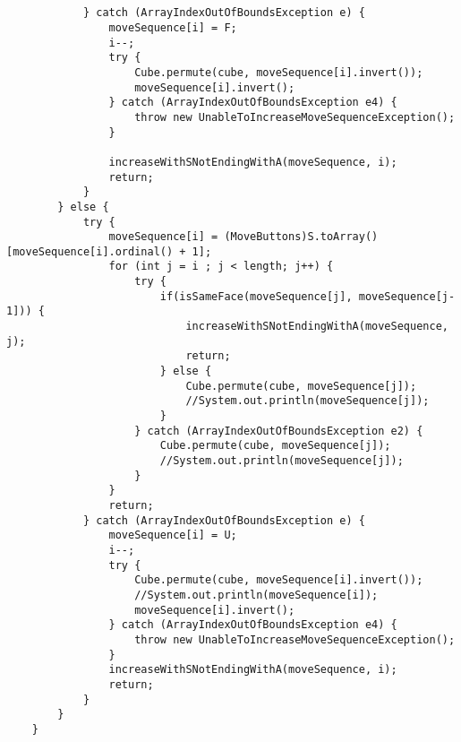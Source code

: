 \begin{verbatim}

		
			} catch (ArrayIndexOutOfBoundsException e) {
				moveSequence[i] = F;
				i--;
				try {
					Cube.permute(cube, moveSequence[i].invert());
					moveSequence[i].invert();
				} catch (ArrayIndexOutOfBoundsException e4) {
					throw new UnableToIncreaseMoveSequenceException();
				}

				increaseWithSNotEndingWithA(moveSequence, i);
				return;
			}
		} else {
			try {
				moveSequence[i] = (MoveButtons)S.toArray()[moveSequence[i].ordinal() + 1];
				for (int j = i ; j < length; j++) {
					try {
						if(isSameFace(moveSequence[j], moveSequence[j-1])) {
							increaseWithSNotEndingWithA(moveSequence, j);
							return;
						} else {
							Cube.permute(cube, moveSequence[j]);
							//System.out.println(moveSequence[j]);
						}
					} catch (ArrayIndexOutOfBoundsException e2) {
						Cube.permute(cube, moveSequence[j]);
						//System.out.println(moveSequence[j]);
					}
				}
				return; 
			} catch (ArrayIndexOutOfBoundsException e) {
				moveSequence[i] = U;
				i--;
				try {
					Cube.permute(cube, moveSequence[i].invert());
					//System.out.println(moveSequence[i]);
					moveSequence[i].invert();
				} catch (ArrayIndexOutOfBoundsException e4) {
					throw new UnableToIncreaseMoveSequenceException();
				}
				increaseWithSNotEndingWithA(moveSequence, i);
				return;
			}
		}
	}
	
\end{verbatim}